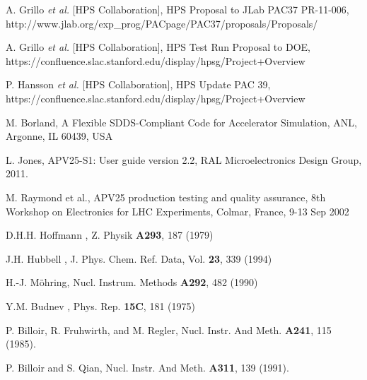 \begin{thebibliography}{99}


 A. Grillo {\it et al.} [HPS Collaboration], HPS Proposal to JLab PAC37 PR-11-006,
 http://www.jlab.org/exp\_prog/PACpage/PAC37/proposals/Proposals/

 A. Grillo {\it et al.} [HPS Collaboration], HPS Test Run Proposal to DOE, 
https://confluence.slac.stanford.edu/display/hpsg/Project+Overview

 P. Hansson {\it et al.} [HPS Collaboration], HPS Update PAC 39, 
https://confluence.slac.stanford.edu/display/hpsg/Project+Overview



 
 M. Borland, A Flexible SDDS-Compliant Code for Accelerator Simulation, ANL, Argonne, IL 60439, USA
 
 
 L. Jones, APV25-S1: User guide version 2.2, RAL Microelectronics Design Group, 2011.

 M. Raymond et al., APV25 production testing and quality assurance, 8th Workshop on Electronics for LHC
	              Experiments, Colmar, France, 9-13 Sep 2002

%
D.H.H. Hoffmann \etal, Z. Physik {\bf A293}, 187 (1979)

J.H. Hubbell \etal, J. Phys. Chem. Ref. Data, Vol. {\bf 23}, 339 (1994) 

 H.-J. M\"{o}hring, Nucl. Instrum. Methods {\bf A292}, 482 (1990)

 Y.M. Budnev \etal, Phys. Rep. {\bf 15C}, 181 (1975)

P. Billoir, R. Fruhwirth, and M. Regler, Nucl. Instr. And Meth. {\bf A241}, 115 (1985). 

P. Billoir and S. Qian, Nucl. Instr. And Meth. {\bf A311}, 139 (1991). 



	               
\end{thebibliography} 
